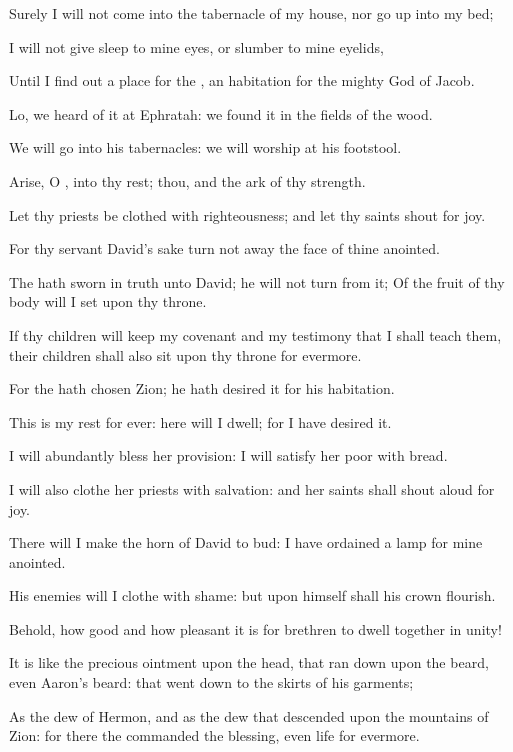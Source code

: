 \Verse Surely I will not come into the tabernacle of my house, nor go up into my bed;

\Verse I will not give sleep to mine eyes, or slumber to mine eyelids,

\Verse Until I find out a place for the \LORD, an habitation for the mighty God of Jacob.

\Verse Lo, we heard of it at Ephratah: we found it in the fields of the wood.

\Verse We will go into his tabernacles: we will worship at his footstool.

\Verse Arise, O \LORD, into thy rest; thou, and the ark of thy strength.

\Verse Let thy priests be clothed with righteousness; and let thy saints shout for joy.

\Verse For thy servant David's sake turn not away the face of thine anointed.

\Verse The \LORD hath sworn in truth unto David; he will not turn from it; Of the fruit of thy body will I set upon thy throne.

\Verse If thy children will keep my covenant and my testimony that I shall teach them, their children shall also sit upon thy throne for evermore.

\Verse For the \LORD hath chosen Zion; he hath desired it for his habitation.

\Verse This is my rest for ever: here will I dwell; for I have desired it.

\Verse I will abundantly bless her provision: I will satisfy her poor with bread.

\Verse I will also clothe her priests with salvation: and her saints shall shout aloud for joy.

\Verse There will I make the horn of David to bud: I have ordained a lamp for mine anointed.

\Verse His enemies will I clothe with shame: but upon himself shall his crown flourish.




\Chapter
\Verse Behold, how good and how pleasant it is for brethren to dwell together in unity!

\Verse It is like the precious ointment upon the head, that ran down upon the beard, even Aaron's beard: that went down to the skirts of his garments;

\Verse As the dew of Hermon, and as the dew that descended upon the mountains of Zion: for there the \LORD commanded the blessing, even life for evermore.




